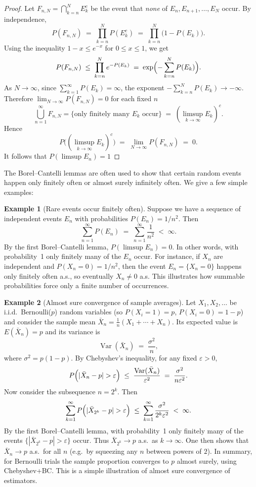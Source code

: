 \documentclass[11pt,a4paper]{article}
\theoremstyle{definition}
\newtheorem{example}{Example}[section]
\begin{document}
\begin{proof}
Let $F_{n,N} = \bigcap_{k=n}^N E_k^c$ be the event that \emph{none} of $E_n, E_{n+1},\dots,E_N$ occur.  By independence, 
\[
P(F_{n,N}) \;=\; \prod_{k=n}^N P(E_k^c) \;=\; \prod_{k=n}^N\bigl(1-P(E_k)\bigr).
\]
Using the inequality $1-x\le e^{-x}$ for $0\le x\le1$, we get 
\[
P(F_{n,N}) \;\le\; \prod_{k=n}^N e^{-P(E_k)} \;=\; \exp\Bigl(-\sum_{k=n}^N P(E_k)\Bigr).
\]
As $N\to\infty$, since $\sum_{k=1}^\infty P(E_k)=\infty$, the exponent $-\sum_{k=n}^N P(E_k)\to -\infty$.  Therefore $\lim_{N\to\infty}P(F_{n,N}) = 0$ for each fixed $n$
\[
\bigcup_{n=1}^\infty F_{n,N} = \{\text{only finitely many }E_k\text{ occur}\} \;=\; (\limsup_{k\to\infty} E_k)^c.
\]
Hence 
\[
P\bigl((\limsup_{k\to\infty}E_k)^c\bigr) \;=\; \lim_{N\to\infty} P(F_{n,N}) \;=\; 0.
\]
It follows that $P(\limsup E_n)=1$
\end{proof}
The Borel--Cantelli lemmas are often used to show that certain random events happen only finitely often or almost surely infinitely often.  We give a few simple examples:

\begin{example}[Rare events occur finitely often]
Suppose we have a sequence of independent events $E_n$ with probabilities $P(E_n)=1/n^2$.  Then 
\[
\sum_{n=1}^\infty P(E_n) \;=\; \sum_{n=1}^\infty \frac{1}{n^2} \;<\;\infty.
\]
By the first Borel--Cantelli lemma, $P(\limsup E_n)=0$.  In other words, with probability~1 only finitely many of the $E_n$ occur. For instance, if $X_n$ are independent and $P(X_n=0)=1/n^2$, then the event $E_n=\{X_n=0\}$ happens only finitely often a.s., so eventually $X_n\neq0$ a.s. This illustrates how summable probabilities force only a finite number of occurrences.
\end{example}


\begin{example}[Almost sure convergence of sample averages]
Let $X_1,X_2,\dots$ be i.i.d.\ Bernoulli($p$) random variables (so $P(X_i=1)=p$, $P(X_i=0)=1-p$) and consider the sample mean $\bar X_n = \tfrac{1}{n}(X_1+\cdots+X_n)$.  Its expected value is $E(\bar X_n)=p$ and its variance is 
\[
\operatorname{Var}(\bar X_n) \;=\; \frac{\sigma^2}{n}, 
\]
where $\sigma^2=p(1-p)$. By Chebyshev's inequality, for any fixed $\varepsilon>0$, 
\[
P\Bigl(|\bar X_n - p| > \varepsilon\Bigr) \;\le\; \frac{\operatorname{Var}(\bar X_n)}{\varepsilon^2} 
\;=\; \frac{\sigma^2}{n\varepsilon^2}.
\]
Now consider the subsequence $n=2^k$.  Then 
\[
\sum_{k=1}^\infty P\Bigl(|\bar X_{2^k} - p| > \varepsilon\Bigr) \;\le\; \sum_{k=1}^\infty \frac{\sigma^2}{2^k\varepsilon^2} \;<\;\infty.
\]
By the first Borel--Cantelli lemma, with probability~1 only finitely many of the events $\{|\bar X_{2^k}-p|>\varepsilon\}$ occur.  Thus $\bar X_{2^k}\to p$ a.s.\ as $k\to\infty$.  One then shows that $\bar X_n\to p$ a.s.\ for all $n$ (e.g.\ by squeezing any $n$ between powers of $2$).  In summary, for Bernoulli trials the sample proportion converges to $p$ almost surely, using Chebyshev+BC.  This is a simple illustration of almost sure convergence of estimators.
\end{example}
\end{document}
